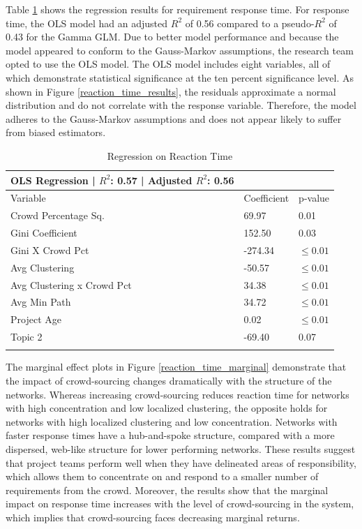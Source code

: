 Table \ref{reaction_time_regression} shows the regression results for requirement response time. For response time, the OLS model had an adjusted $R^2$ of 0.56 compared to a pseudo-$R^2$ of 0.43 for the Gamma GLM. Due to better model performance and because the model appeared to conform to the Gauss-Markov assumptions, the research team opted to use the OLS model. The OLS model includes eight variables, all of which demonstrate statistical significance at the ten percent significance level. As shown in Figure \ref{reaction_time_results}, the residuals approximate a normal distribution and do not correlate with the response variable. Therefore, the model adheres to the Gauss-Markov assumptions and does not appear likely to suffer from biased estimators.

\begin{table}
\caption{Regression on Reaction Time}
\label{reaction_time_regression}
\begin{tabular}{lll}
OLS Regression | $R^2$: 0.57 | Adjusted $R^2$: 0.56 \\
\hline\noalign{\smallskip}
Variable & Coefficient & p-value  \\
\noalign{\smallskip}\hline\noalign{\smallskip}
Crowd Percentage Sq. & 69.97 & 0.01 \\
Gini Coefficient & 152.50 & 0.03 \\
Gini X Crowd Pct & -274.34 & $\leq 0.01$ \\
Avg Clustering & -50.57 & $\leq 0.01$ \\
Avg Clustering x Crowd Pct & 34.38 & $\leq 0.01$ \\
Avg Min Path & 34.72 & $\leq 0.01$ \\
Project Age & 0.02 & $\leq 0.01$ \\
Topic 2 & -69.40 & 0.07 \\
\noalign{\smallskip}\hline
\end{tabular}
\end{table}

The marginal effect plots in Figure \ref{reaction_time_marginal} demonstrate that the impact of crowd-sourcing changes dramatically with the structure of the networks. Whereas increasing crowd-sourcing reduces reaction time for networks with high concentration and low localized clustering, the opposite holds for networks with high localized clustering and low concentration. Networks with faster response times have a hub-and-spoke structure, compared with a more dispersed, web-like structure for lower performing networks. These results suggest that project teams perform well when they have delineated areas of responsibility, which allows them to concentrate on and respond to a smaller number of requirements from the crowd. Moreover, the results show that the marginal impact on response time increases with the level of crowd-sourcing in the system, which implies that crowd-sourcing faces decreasing marginal returns.

